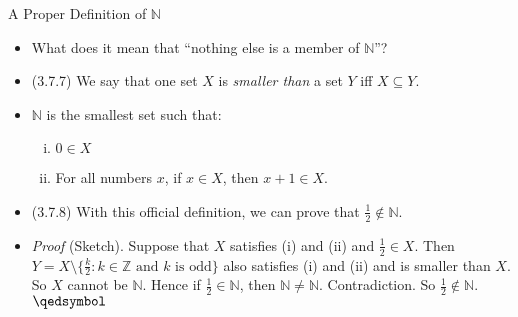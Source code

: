 \begin{frame}{A Proper Definition of $\mathbb{N}$}

	\begin{itemize}

		\item What does it mean that ``nothing else is a member of $\mathbb{N}$''?
		
		\item (3.7.7) We say that one set $X$ is \emph{smaller than} a set $Y$ iff $X\subseteq Y$.
		
		\item $\mathbb{N}$ is the smallest set such that:
		
		\begin{enumerate}[(i)]
	
		\item $0\in X$
		
		\item For all numbers $x$, if $x\in X$, then $x+1\in X$.
	
	\end{enumerate}
	
		\item (3.7.8) With this official definition, we can prove that $\frac{1}{2}\notin \mathbb{N}$.
		
		\item \emph{Proof} (Sketch). Suppose that $X$ satisfies (i) and (ii) and $\frac{1}{2}\in X$. Then $Y=X\setminus \{\frac{k}{2}: k\in \mathbb{Z}\text{ and }k\text{ is odd}\}$ also satisfies (i) and (ii) and is smaller than $X$. So $X$ cannot be $\mathbb{N}$. Hence if $\frac{1}{2}\in\mathbb{N}$, then $\mathbb{N}\neq\mathbb{N}$. Contradiction. So $\frac{1}{2}\notin\mathbb{N}$. $\qedsymbol$
	
	\end{itemize}

\end{frame}

